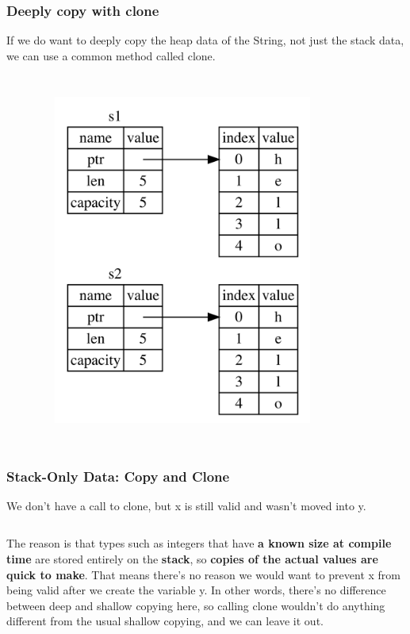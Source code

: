 \documentclass{beamer}
\begin{document}
\begin{frame}[fragile]
	\frametitle{Deeply copy with clone}
	If we do want to deeply copy the heap data of the String, not just the stack data, we can use a common method called clone.
	
	\begin{columns}
		\inputminted{rust}{./code/move-clone.rs}
		\begin{figure}
			\centering
			\includegraphics[width=0.8\textwidth]{./img/trpl04-03.png}
			\label{fig:figureSAnotherPossibility2}
		\end{figure}
	\end{columns}
\end{frame}



\begin{frame}[fragile]
	\frametitle{Stack-Only Data: Copy and Clone}
	We don’t have a call to clone, but x is still valid and wasn’t moved into y.
	\inputminted{rust}{./code/move2.rs}
	
	The reason is that types such as integers that have \textbf{a known size at compile time} are stored entirely on the \textbf{stack}, so \textbf{copies of the actual values are quick to make}. That means there’s no reason we would want to prevent x from being valid after we create the variable y. In other words, there’s no difference between deep and shallow copying here, so calling clone wouldn’t do anything different from the usual shallow copying, and we can leave it out.
\end{frame}
\end{document}
